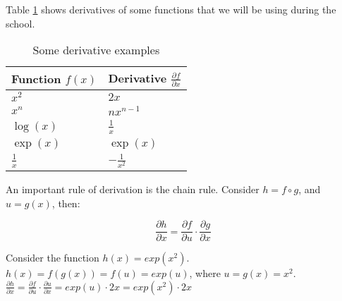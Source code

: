 Table \ref{tb::derivatives} shows derivatives of some functions that we will be using during the school. 

\begin{table}
\begin{center}
\begin{tabular}{|l|l|}
\hline
Function $f(x)$& Derivative $\frac{\partial f}{\partial x}$\\
\hline
$x^2$ & $2x$\\
\hline
$x^n$ & $nx^{n-1}$\\
\hline
$\log(x)$ & $\frac{1}{x}$\\
\hline
$\exp(x)$ & $\exp(x)$\\
\hline
$\frac{1}{x}$ & $-\frac{1}{x^{2}}$\\
\hline
\end{tabular}
\end{center}
\caption{\label{tb::derivatives}Some derivative examples}
\end{table}

An important rule of derivation is the chain rule. Consider $h=f\circ g$, and $u=g(x)$, then:

\begin{equation}
\frac{\partial h}{\partial x}=\frac{\partial f}{\partial u}\cdot\frac{\partial g}{\partial x}
\end{equation}

\begin{example}


Consider the function $h(x)=exp(x^{2})$. \\
$h(x)=f(g(x))=f(u)=exp(u)$, where $u=g(x)=x^{2}$.\\
$\frac{\partial h}{\partial x}=\frac{\partial f}{\partial u}\cdot \frac{\partial u}{\partial x}=exp(u) \cdot 2x=exp(x^{2}) \cdot 2x$\\

\end{example}

